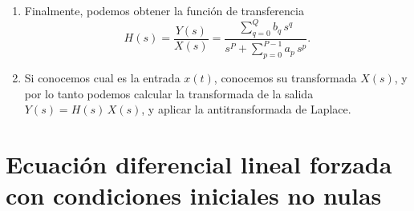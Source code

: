 \begin{enumerate}
\item Finalmente, podemos obtener la función de transferencia
\begin{equation}
 H(s) = \frac{Y(s)}{X(s)} = 
 \frac{\sum_{q=0}^{Q} b_{q} \, s^{q}}{s^{P} + \sum_{p=0}^{P-1} a_{p} \, s^{p}}.
\end{equation}

\item Si conocemos cual es la entrada $x(t)$, conocemos su transformada $X(s)$, y por lo tanto podemos calcular
la transformada de la salida $Y(s) = H(s) \, X(s)$,
y aplicar la antitransformada de Laplace.

\end{enumerate}

\section{Ecuaci\'{o}n diferencial lineal forzada con condiciones iniciales no nulas}

